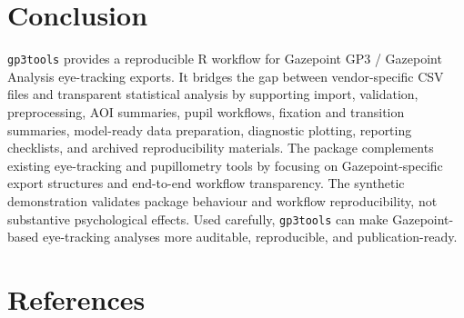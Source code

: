 \documentclass[
]{article}
\begin{document}
\section{Conclusion}\label{conclusion}

\texttt{gp3tools} provides a reproducible R workflow for Gazepoint GP3 /
Gazepoint Analysis eye-tracking exports. It bridges the gap between
vendor-specific CSV files and transparent statistical analysis by
supporting import, validation, preprocessing, AOI summaries, pupil
workflows, fixation and transition summaries, model-ready data
preparation, diagnostic plotting, reporting checklists, and archived
reproducibility materials. The package complements existing eye-tracking
and pupillometry tools by focusing on Gazepoint-specific export
structures and end-to-end workflow transparency. The synthetic
demonstration validates package behaviour and workflow reproducibility,
not substantive psychological effects. Used carefully, \texttt{gp3tools}
can make Gazepoint-based eye-tracking analyses more auditable,
reproducible, and publication-ready.

\section*{References}\label{references}
\end{document}
